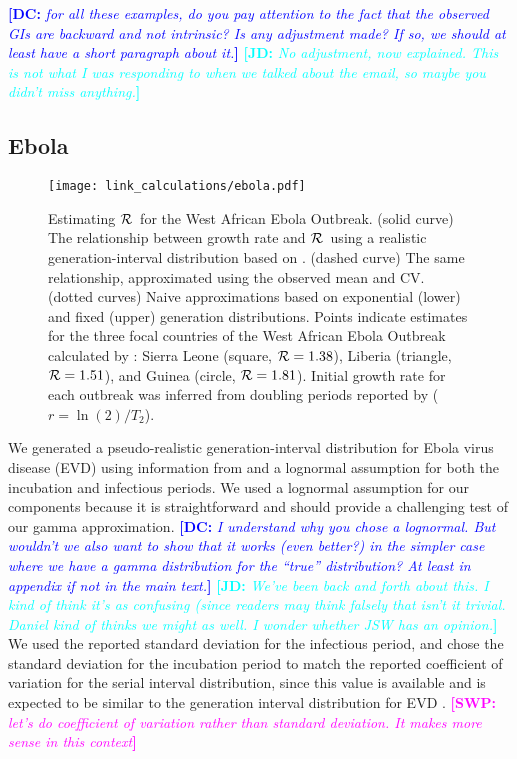 \documentclass[12pt]{article}
\newcommand{\RR}{\ensuremath{{\cal R}}}
\newcommand{\comment}[3]{\textcolor{#1}{\textbf{[#2: }\textit{#3}\textbf{]}}}
\newcommand{\jd}[1]{\comment{cyan}{JD}{#1}}
\newcommand{\swp}[1]{\comment{magenta}{SWP}{#1}}
\newcommand{\dc}[1]{\comment{blue}{DC}{#1}}
\begin{document}
\dc{for all these examples, do you pay attention to the fact that the observed GIs are \emph{backward} and not intrinsic? Is any adjustment made? If so, we should at least have a short paragraph about it.} \jd{No adjustment, now explained. This is not what I was responding to when we talked about the email, so maybe you didn't miss anything.}

\subsection{Ebola}
\label{EbolaEx}

\begin{figure}[htbp] \centering
	\texttt{[image: link\_calculations/ebola.pdf]}
	\caption{Estimating \RR~for the West African Ebola Outbreak.
(solid curve) The relationship between growth rate and \RR~using a realistic generation-interval distribution based on \cite{AylwBarb14}.
(dashed curve) The same relationship, approximated using the observed mean and CV. 
(dotted curves) Naive approximations based on exponential (lower) and fixed (upper) generation distributions.
Points indicate estimates for the three focal countries of the West African Ebola Outbreak calculated by \cite{AylwBarb14}: {Sierra Leone (square, $\RR=1.38$), Liberia (triangle, $\RR=1.51$), and Guinea (circle, $\RR=1.81$).} Initial growth rate for each outbreak was inferred from doubling periods reported by \cite{AylwBarb14} ($r = \ln(2)/T_2$).
	\label{fig:EbolaCurve}}
\end{figure}

We generated a pseudo-realistic generation-interval distribution for Ebola virus disease (EVD) using information from \cite{AylwBarb14} and a lognormal assumption for both the incubation and infectious periods.
We used a lognormal assumption for our components because it is straightforward and should provide a challenging test of our gamma approximation. 
\dc{I understand why you chose a lognormal. But wouldn't we also want to show that it works (even better?) in the simpler case where we have a gamma distribution for the ``true'' distribution? At least in appendix if not in the main text.}
\jd{We've been back and forth about this. I kind of think it's as confusing (since readers may think falsely that isn't it trivial. Daniel kind of thinks we might as well. I wonder whether JSW has an opinion.}
We used the reported standard deviation for the infectious period, and chose the standard deviation for the incubation period to match the reported coefficient of variation for the serial interval distribution, since this value is available and is expected to be similar to the generation interval distribution for EVD \cite{AylwBarb14}. \swp{let's do coefficient of variation rather than standard deviation. It makes more sense in this context}
\end{document}
